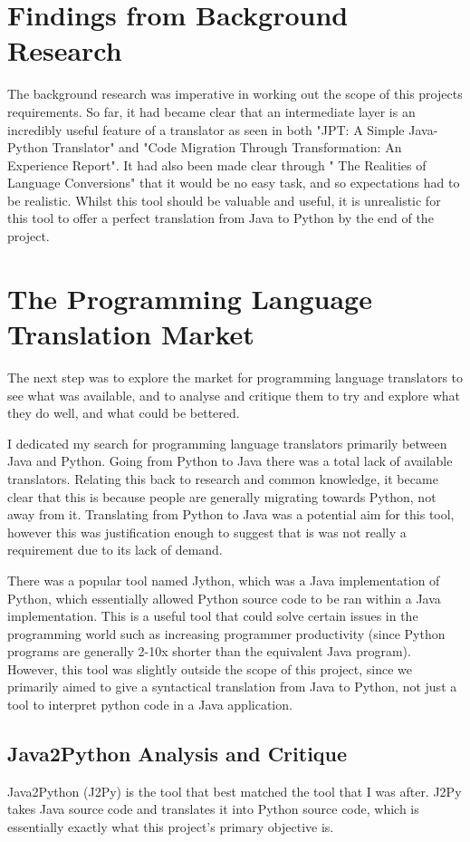 \documentclass{l4proj}
\begin{document}
\section{Findings from Background Research}
The background research was imperative in working out the scope of this projects requirements. So far, it had became clear that an intermediate layer is an incredibly useful feature of a translator as seen in both "JPT: A Simple Java-Python Translator" and "Code Migration Through Transformation: An Experience Report". It had also been made clear through " The Realities of Language Conversions" that it would be no easy task, and so expectations had to be realistic. Whilst this tool should be valuable and useful, it is unrealistic for this tool to offer a perfect translation from Java to Python by the end of the project.

\section{The Programming Language Translation Market}
The next step was to explore the market for programming language translators to see what was available, and to analyse and critique them to try and explore what they do well, and what could be bettered.

I dedicated my search for programming language translators primarily between Java and Python. Going from Python to Java there was a total lack of available translators. Relating this back to research and common knowledge, it became clear that this is because people are generally migrating towards Python, not away from it. Translating from Python to Java was a potential aim for this tool, however this was justification enough to suggest that is was not really a requirement due to its lack of demand.

There was a popular tool named Jython, which was a Java implementation of Python, which essentially allowed Python source code to be ran within a Java implementation. This is a useful tool that could solve certain issues in the programming world such as increasing programmer productivity (since Python programs are generally 2-10x shorter than the equivalent Java program). However, this tool was slightly outside the scope of this project, since we primarily aimed to give a syntactical translation from Java to Python, not just a tool to interpret python code in a Java application. 

\subsection{Java2Python Analysis and Critique}
Java2Python (J2Py) is the tool that best matched the tool that I was after. J2Py takes Java source code and translates it into Python source code, which is essentially exactly what this project's primary objective is. 
\end{document}

